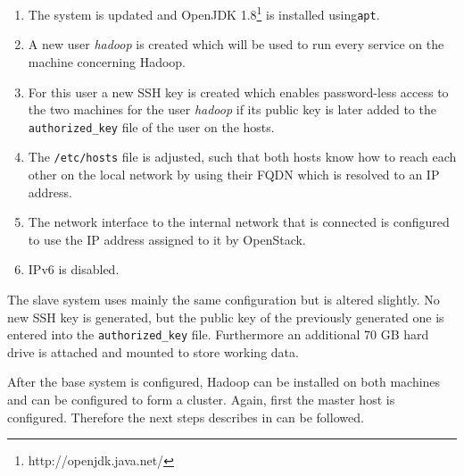\begin{enumerate}
    \item The system is updated and OpenJDK 1.8\footnote{http://openjdk.java.net/}  is installed using\texttt{apt}. 
    \item A new user \emph{hadoop} is created which will be used to run every service on the machine concerning Hadoop.
    \item For this user a new \ac{SSH} key is created which enables password-less access to the two machines for the user \emph{hadoop} if its public key is later added to the \texttt{authorized\_key} file of the user on the hosts.
    \item The \texttt{/etc/hosts} file is adjusted, such that both hosts know how to reach each other on the local network by using their \acs{FQDN} which is resolved to an \ac{IP} address.
    \item The network interface to the internal network that is connected is configured to use the \ac{IP} address assigned to it by OpenStack.
    \item \ac{IP}v6 is disabled.
\end{enumerate}

The slave system uses mainly the same configuration but is altered slightly.
No new \ac{SSH} key is generated, but the public key of the previously
generated one is entered into the \texttt{authorized\_key} file. 
Furthermore an additional 70 \ac{GB} hard drive is attached 
and mounted to store working data.

After the base system is configured, Hadoop can be installed on both machines
and can be configured to form a cluster.
Again, first the master host is configured.
Therefore the next steps describes in 
\autocite[][Appendix A]{white2015hadoop}
can be followed.

